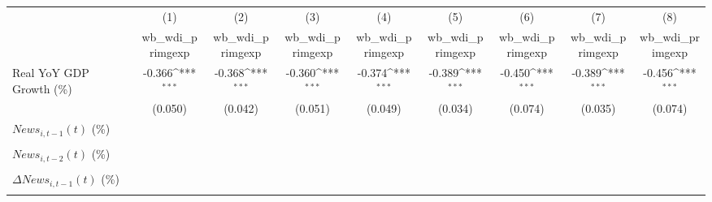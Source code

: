 {
\def\sym#1{\ifmmode^{#1}\else\(^{#1}\)\fi}
\begin{tabular}{l*{8}{c}}
\toprule
                    &\multicolumn{1}{c}{(1)}&\multicolumn{1}{c}{(2)}&\multicolumn{1}{c}{(3)}&\multicolumn{1}{c}{(4)}&\multicolumn{1}{c}{(5)}&\multicolumn{1}{c}{(6)}&\multicolumn{1}{c}{(7)}&\multicolumn{1}{c}{(8)}\\
                    &\multicolumn{1}{c}{wb_wdi_primgexp}&\multicolumn{1}{c}{wb_wdi_primgexp}&\multicolumn{1}{c}{wb_wdi_primgexp}&\multicolumn{1}{c}{wb_wdi_primgexp}&\multicolumn{1}{c}{wb_wdi_primgexp}&\multicolumn{1}{c}{wb_wdi_primgexp}&\multicolumn{1}{c}{wb_wdi_primgexp}&\multicolumn{1}{c}{wb_wdi_primgexp}\\
\midrule
Real YoY GDP Growth (\%)&      -0.366\sym{***}&      -0.368\sym{***}&      -0.360\sym{***}&      -0.374\sym{***}&      -0.389\sym{***}&      -0.450\sym{***}&      -0.389\sym{***}&      -0.456\sym{***}\\
                    &     (0.050)         &     (0.042)         &     (0.051)         &     (0.049)         &     (0.034)         &     (0.074)         &     (0.035)         &     (0.074)         \\
\addlinespace
$ News_{i,t-1}(t)$ (\%)&                     &                     &                     &                     &                     &                     &                     &                     \\
                    &                     &                     &                     &                     &                     &                     &                     &                     \\
\addlinespace
$ News_{i,t-2}(t)$ (\%)&                     &                     &                     &                     &                     &                     &                     &                     \\
                    &                     &                     &                     &                     &                     &                     &                     &                     \\
\addlinespace
$ \Delta News_{i,t-1}(t)$ (\%)&                     &                     &                     &                     &                     &                     &                     &                     \\
                    &                     &                     &                     &                     &                     &                     &                     &                     \\

\end{tabular}}
